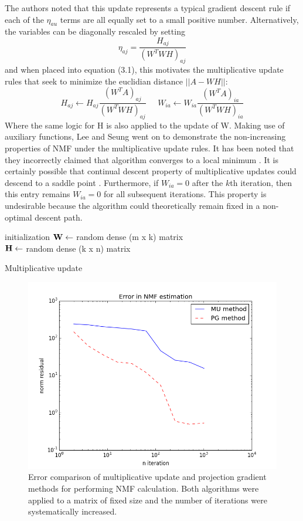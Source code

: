 \documentclass[final,leqno,onefignum,onetabnum]{siamltex1213}
\begin{document}
The authors noted that this update represents a typical gradient descent rule if each of the $\eta_{au} $ terms are all equally set to a small positive number. Alternatively, the variables can be diagonally rescaled by setting
\begin{equation}\label{et1}
 \eta_{aj} = \frac{ H_{aj} }{(W^T WH)_{aj}}
\end{equation}
and when placed into equation (3.1), this motivates the multiplicative update rules that seek to minimize the euclidian distance $||A - WH ||$:
\begin{equation}\label{au1}
 H_{aj} \leftarrow  H_{aj} \frac{(W^T A)_{aj} }{ (W^T WH)_{aj} } \; \; \; \; \; W_{ia} \leftarrow  W_{ia} \frac{(W^T A)_{ia} }{ (W^T WH)_{ia} }
\end{equation}
Where the same logic for H is also applied to the update of W. Making use of auxiliary functions, Lee and Seung went on to demonstrate the non-increasing properties of NMF under the multiplicative update rules. It has been noted that they incorrectly claimed that algorithm converges to a local minimum \cite{Chu, Gon, Lin}. It is certainly possible that continual descent property of multiplicative updates could descend to a saddle point \cite{Ber}. Furthermore, if $W_{ia} = 0$ after the $k$th iteration, then this entry remains $W_{ia} = 0$ for all subsequent iterations. This property is undesirable because the algorithm could theoretically remain fixed in a non-optimal descent path. \\

\begin{algorithm}[H]

 initialization\;
$\bf{W} \gets $ random dense (m x k) matrix\\
$\bf{H} \gets $ random dense (k x n) matrix\\
 \caption{Multiplicative update}
\end{algorithm}

\begin{figure}[t!]
  \centering
    \includegraphics[width=.5\linewidth]{NMF_MU_vs_PG_error}
  \caption{Error comparison of multiplicative update and projection gradient methods for performing NMF calculation. Both algorithms were applied to a matrix of fixed size and the number of iterations were systematically increased.}
\end{figure}
\end{document}
